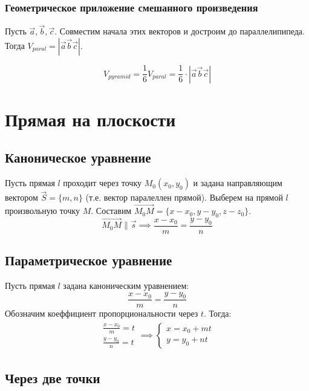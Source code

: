 \subsubsection{Геометрическое приложение смешанного произведения}

Пусть $\vec{a}, \vec{b}, \vec{c}$. Совместим начала этих векторов и достроим до параллелипипеда. Тогда $V_{paral} = |\vec{a} \vec{b} \vec{c}|$.
\begin{note}
  \[
    V_{pyramid} = \frac{1}{6} V_{paral} = \frac{1}{6} \cdot |\vec{a} \vec{b} \vec{c}| 
  \] 
\end{note}


\section{Прямая на плоскости}

\subsection{Каноническое уравнение}

Пусть прямая $l$ проходит через точку $M_0(x_0, y_0)$ и задана направляющим вектором $\vec{S} = \{m, n\}$ (т.е. вектор паралеллен прямой). Выберем на прямой $l$ произвольную точку $M$.
Составим $\overrightarrow{M_0M} = \{x - x_0, y - y_0, z - z_0\}$. 
\[
  \overrightarrow{M_0M} \parallel \vec{s} \implies \boxed{\frac{x - x_0}{m} = \frac{y - y_0}{n}}
\]

\subsection{Параметрическое уравнение}

Пусть прямая $l$ задана каноническим уравнением: \[
\frac{x - x_0}{m} = \frac{y - y_0}{n}
\] 
Обозначим коеффициент пропорциональности через $t$. Тогда:
\begin{gather*}
  \begin{matrix}
    \frac{x - x_0}{m} = t \\
    \frac{y - y_0}{n} = t
  \end{matrix} \implies \boxed{\begin{cases}
    x = x_0 + mt \\
    y = y_0 + nt
  \end{cases}}
\end{gather*}
 
\subsection{Через две точки}

